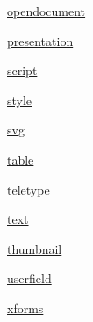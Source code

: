 \begin{DoxyCompactItemize}
 \hyperlink{namespaceodf_1_1opendocument}{opendocument}
\item 
 \hyperlink{namespaceodf_1_1presentation}{presentation}
\item 
 \hyperlink{namespaceodf_1_1script}{script}
\item 
 \hyperlink{namespaceodf_1_1style}{style}
\item 
 \hyperlink{namespaceodf_1_1svg}{svg}
\item 
 \hyperlink{namespaceodf_1_1table}{table}
\item 
 \hyperlink{namespaceodf_1_1teletype}{teletype}
\item 
 \hyperlink{namespaceodf_1_1text}{text}
\item 
 \hyperlink{namespaceodf_1_1thumbnail}{thumbnail}
\item 
 \hyperlink{namespaceodf_1_1userfield}{userfield}
\item 
 \hyperlink{namespaceodf_1_1xforms}{xforms}
\end{DoxyCompactItemize}
